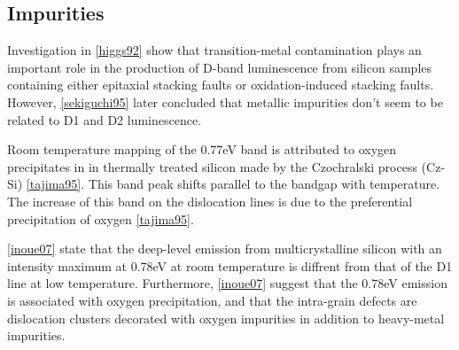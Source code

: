 \subsection{Impurities}

Investigation in \ref{higgs92} show that transition-metal contamination plays an important role in the production of D-band luminescence from silicon samples containing either epitaxial stacking faults or oxidation-induced stacking faults. However, \ref{sekiguchi95} later concluded that metallic impurities don't seem to be related to D1 and D2 luminescence.

Room temperature mapping of the 0.77eV band is attributed to oxygen precipitates in in thermally treated silicon made by the Czochralski process (Cz-Si) \ref{tajima95}. This band peak shifts parallel to the bandgap with temperature. The increase of this band on the dislocation lines is due to the preferential precipitation of oxygen \ref{tajima95}.




\ref{inoue07} state that the deep-level emission from multicrystalline silicon with an intensity maximum at 0.78eV at room temperature is diffrent from that of the D1 line at low temperature. Furthermore, \ref{inoue07} suggest that the 0.78eV emission is associated with oxygen precipitation, and that the intra-grain defects are dislocation clusters decorated with oxygen impurities in addition to heavy-metal impurities.